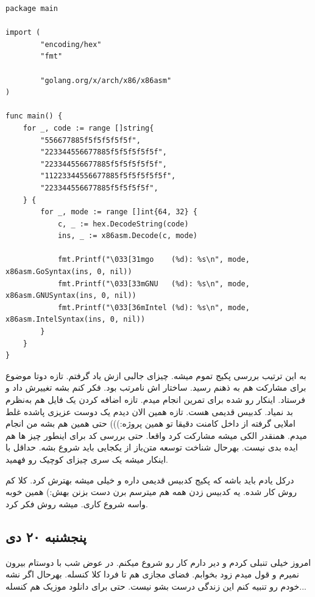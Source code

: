 \begin{latin}
\begin{verbatim}
package main

import (
        "encoding/hex"
        "fmt"

        "golang.org/x/arch/x86/x86asm"
)

func main() {
    for _, code := range []string{
        "556677885f5f5f5f5f5f",
        "223344556677885f5f5f5f5f5f",
        "223344556677885f5f5f5f5f5f",
        "11223344556677885f5f5f5f5f5f",
        "223344556677885f5f5f5f5f",
    } {
        for _, mode := range []int{64, 32} {
            c, _ := hex.DecodeString(code)
            ins, _ := x86asm.Decode(c, mode)

            fmt.Printf("\033[31mgo    (%d): %s\n", mode, x86asm.GoSyntax(ins, 0, nil))
            fmt.Printf("\033[33mGNU   (%d): %s\n", mode, x86asm.GNUSyntax(ins, 0, nil))
            fmt.Printf("\033[36mIntel (%d): %s\n", mode, x86asm.IntelSyntax(ins, 0, nil))
        }
    }
}
\end{verbatim}
\end{latin}

به این ترتیب بررسی پکیج  تموم میشه. چیزای جالبی ازش یاد گرفتم. تازه دوتا موضوع برای مشارکت هم به ذهنم رسید.
ساختار  اش نامرتب بود. فکر کنم بشه تغییرش داد و فرستاد. اینکار رو شده برای تمرین انجام میدم.
تازه اضافه کردن یک فایل  هم به‌نظرم بد نمیاد. کدبیس قدیمی هست. تازه همین الان دیدم یک دوست عزیزی
پاشده غلط املایی گرفته از داخل کامنت دقیقا تو همین پروژه:)))
حتی همین هم بشه من انجام میدم. همنقدر الکی میشه مشارکت کرد واقعا. حتی بررسی کد برای اینطور چیز ها هم ایده بدی نیست.
بهرحال شناخت  توسعه متن‌باز از یکجایی باید شروع بشه. حداقل با اینکار میشه یک سری چیزای کوچیک رو فهمید.

درکل یادم باید باشه که پکیج  کدبیس قدیمی داره و خیلی میشه بهترش کرد. کلا کم روش کار شده. یه کدبیس زدن همه
هم میترسم برن دست بزنن بهش:) همین خوبه واسه شروع کاری. میشه روش فکر کرد.

\subsection{پنجشنبه ۲۰ دی}
امروز خیلی تنبلی کردم و دیر دارم کار رو شروع میکنم. در عوض شب با دوستام بیرون نمیرم و قول میدم زود بخوابم.
فضای مجازی هم تا فردا کلا کنسله. بهرحال اگر نشه خودم رو تنبیه کنم این زندگی درست بشو نیست. حتی برای دانلود موزیک هم کنسله...

